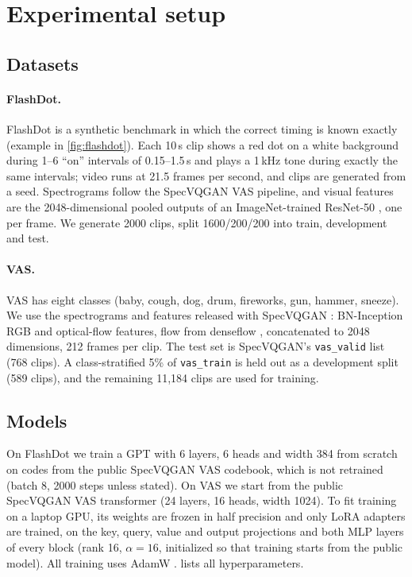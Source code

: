 \section{Experimental setup}
\label{sec:setup}

\subsection{Datasets}
\label{sec:data}

\paragraph{FlashDot.}
FlashDot is a synthetic benchmark in which the correct timing is known exactly (example in \cref{fig:flashdot}). Each 10\,s clip shows a red dot on a white background during 1--6 ``on'' intervals of 0.15--1.5\,s and plays a 1\,kHz tone during exactly the same intervals; video runs at 21.5 frames per second, and clips are generated from a seed. Spectrograms follow the SpecVQGAN VAS pipeline, and visual features are the 2048-dimensional pooled outputs of an ImageNet-trained ResNet-50 \citep{he2016resnet}, one per frame. We generate 2000 clips, split 1600/200/200 into train, development and test.


\paragraph{VAS.}
VAS \citep{chen2020regnet} has eight classes (baby, cough, dog, drum, fireworks, gun, hammer, sneeze). We use the spectrograms and features released with SpecVQGAN \citep{iashin2021taming}: BN-Inception \citep{ioffe2015batch} RGB and optical-flow features, flow from denseflow \citep{wang2020denseflow}, concatenated to 2048 dimensions, 212 frames per clip. The test set is SpecVQGAN's \texttt{vas\_valid} list (768 clips). A class-stratified 5\% of \texttt{vas\_train} is held out as a development split (589 clips), and the remaining 11{,}184 clips are used for training.

\subsection{Models}
\label{sec:models}

On FlashDot we train a GPT with 6 layers, 6 heads and width 384 from scratch on codes from the public SpecVQGAN VAS codebook, which is not retrained (batch 8, 2000 steps unless stated). On VAS we start from the public SpecVQGAN VAS transformer (24 layers, 16 heads, width 1024). To fit training on a laptop GPU, its weights are frozen in half precision and only LoRA adapters \citep{hu2022lora} are trained, on the key, query, value and output projections and both MLP layers of every block (rank 16, $\alpha = 16$, initialized so that training starts from the public model). All training uses AdamW \citep{loshchilov2019adamw}.  lists all hyperparameters.

